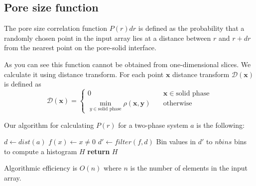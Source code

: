 \documentclass[reprint,amsmath,amssymb,aps,pre,nofootinbib]{revtex4-1}
\begin{document}
\subsection{Pore size function}
The pore size correlation function $P(r)dr$ is defined as the probability that a
randomly chosen point in the input array lies at a distance between
$r$ and $r + dr$ from the nearest point on the pore-solid interface.

As you can see this function cannot be obtained from one-dimensional slices. We
calculate it using distance transform. For each point $\bm{x}$ distance
transform $\mathcal{D}(\bm{x})$ is defined as
\begin{equation*}
  \mathcal{D}(\bm{x})= \left\{
  \begin{array}{ll}
    0 & \quad \bm{x} \in \text{solid phase} \\
    \min\limits_{y \in \text{solid phase}} \rho(\bm{x},\bm{y}) & \quad \text{otherwise}
  \end{array}
\right.
\end{equation*}

Our algorithm for calculating $P(r)$ for a two-phase system $a$ is the
following:
\begin{algorithmic}[1]
    \State $d \gets dist(a)$ 
    \State $f(x) \gets x \ne 0$
    \State $d' \gets filter(f, d)$
    \State Bin values in $d'$ to $nbins$ bins to compute a histogram $H$
    \State \textbf{return} $H$
  \EndProcedure
\end{algorithmic}
Algorithmic efficiency is $O(n)$ where $n$ is the number of elements in the
input array.
\end{document}
